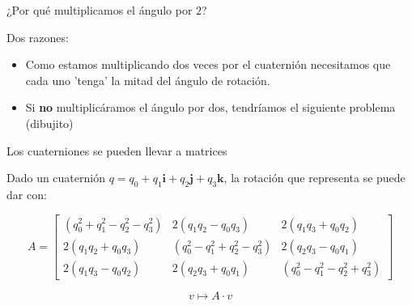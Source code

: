\documentclass[10pt]{beamer}
\def\R{\mathbb{R}}
\begin{document}
\begin{frame}{¿Por qué multiplicamos el ángulo por $2$?}

Dos razones:

\begin{itemize}
    \item Como estamos multiplicando dos veces por el cuaternión necesitamos que cada uno 'tenga' la mitad del ángulo de rotación.
    \item Si \textbf{no} multiplicáramos el ángulo por dos, tendríamos el siguiente problema (dibujito)
\end{itemize}








\end{frame}

\iffalse
\begin{frame}{Los cuaterniones se pueden llevar a matrices}

Dado un cuaternión $q=q_0 + q_1 \textbf{i} + q_2 \textbf{j} + q_3 \textbf{k}$, la rotación que representa se puede dar con: 

\[
A = \begin{bmatrix}
    (q_0^2+q_1^2-q_2^2-q_3^2)  &  2(q_1 q_2 - q_0 q_3) & 2(q_1 q_3 + q_0 q_2)      \\
    2(q_1 q_2 + q_0 q_3) & (q_0^2 - q_1^2 + q_2^2 - q_3^2) & 2(q_2 q_3 - q_0 q_1) \\
    2(q_1 q_3 - q_0 q_2) & 2(q_2 q_3 + q_0 q_1) & (q_0^2 - q_1^2 - q_2^2 + q_3^2)
\end{bmatrix}
\]



$$v \mapsto A\cdot v$$
\end{frame}
\end{document}
